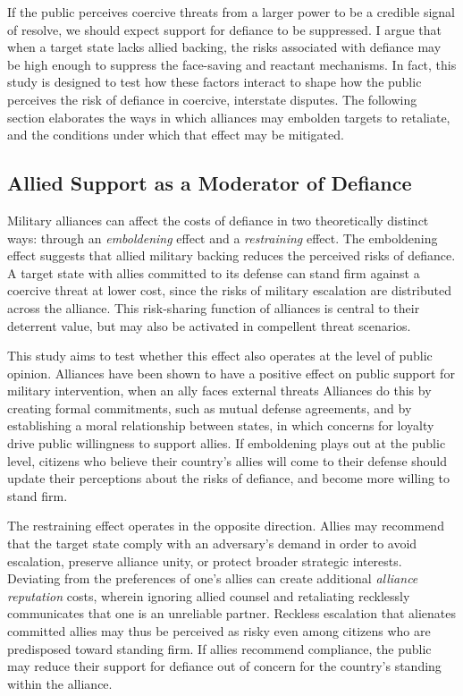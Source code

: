 If the public perceives coercive threats from a larger power to be a credible signal of resolve, we should expect support for defiance to be suppressed. I argue that when a target state lacks allied backing, the risks associated with defiance may be high enough to suppress the face-saving and reactant mechanisms. In fact, this study is designed to test how these factors interact to shape how the public perceives the risk of defiance in coercive, interstate disputes. The following section elaborates the ways in which alliances may embolden targets to retaliate, and the conditions under which that effect may be mitigated.  

\subsection{Allied Support as a Moderator of Defiance}
Military alliances can affect the costs of defiance in two theoretically distinct ways: through an \textit{emboldening} effect and a \textit{restraining} effect.\autocite{fang_concede_2014} The emboldening effect suggests that allied military backing reduces the perceived risks of defiance. A target state with allies committed to its defense can stand firm against a coercive threat at lower cost, since the risks of military escalation are distributed across the alliance. This risk-sharing function of alliances is central to their deterrent value,\autocite{leeds_alliances_2003, benson_inducing_2014} but may also be activated in compellent threat scenarios. 

This study aims to test whether this effect also operates at the level of public opinion. Alliances have been shown to have a positive effect on public support for military intervention, when an ally faces external threats \autocite{tomz_military_2021, tomz_how_2023} Alliances do this by creating formal commitments, such as mutual defense agreements, and by establishing a moral relationship between states, in which concerns for loyalty drive public willingness to support allies. If emboldening plays out at the public level, citizens who believe their country's allies will come to their defense should update their perceptions about the risks of defiance, and become more willing to stand firm.

The restraining effect operates in the opposite direction.\autocite{fang_concede_2014} Allies may recommend that the target state comply with an adversary's demand in order to avoid escalation, preserve alliance unity, or protect broader strategic interests. Deviating from the preferences of one's allies can create additional \textit{alliance reputation} costs, wherein ignoring allied counsel and retaliating recklessly communicates that one is an unreliable partner.\autocite{fang_concede_2014} Reckless escalation that alienates committed allies may thus be perceived as risky even among citizens who are predisposed toward standing firm. If allies recommend compliance, the public may reduce their support for defiance out of concern for the country's standing within the alliance. 



